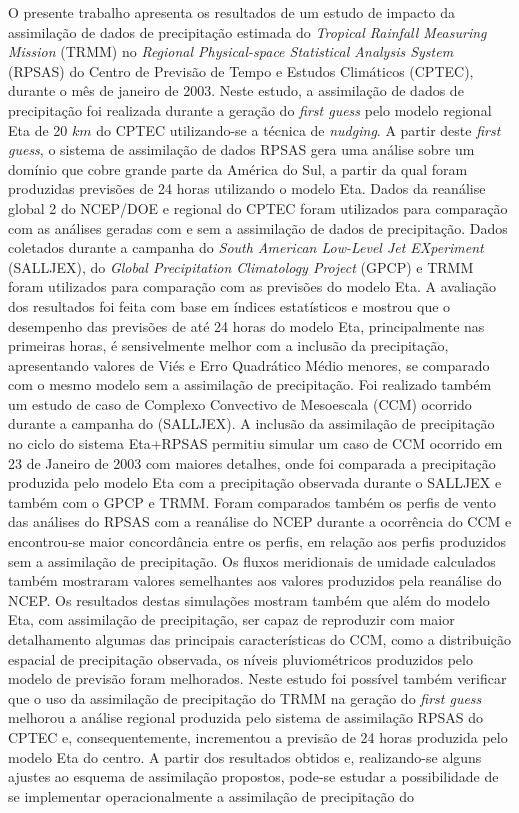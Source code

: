 \begin{resumo}
\hypertarget{estilo:abstract}{}

O presente trabalho apresenta os resultados de um estudo de impacto da assimilação de dados de precipitação estimada do \textit{Tropical Rainfall Measuring Mission} (TRMM) no \textit{Regional Physical-space Statistical Analysis System} (RPSAS) do Centro de Previsão de Tempo e Estudos Climáticos (CPTEC), durante  o mês de janeiro de 2003. Neste estudo, a assimilação de dados de precipitação foi realizada durante a geração do \textit{first guess} pelo modelo regional Eta de 20 $km$ do CPTEC utilizando-se a técnica de \textit{nudging}. A partir deste \textit{first guess}, o sistema de assimilação de dados RPSAS gera uma análise sobre um domínio que cobre grande parte da América do Sul, a partir da qual foram produzidas previsões de 24 horas utilizando o modelo Eta. Dados da reanálise global 2 do NCEP/DOE e regional do CPTEC foram utilizados para comparação com as análises geradas com e sem a assimilação de dados de precipitação. Dados coletados durante a campanha do \textit{South American Low-Level Jet EXperiment} (SALLJEX), do \textit{Global Precipitation Climatology Project} (GPCP) e TRMM foram utilizados para comparação com as previsões do modelo Eta. A avaliação dos resultados foi feita com base em índices estatísticos e mostrou que o desempenho das previsões de até 24 horas do modelo Eta, principalmente nas primeiras horas, é sensivelmente melhor com a inclusão da precipitação, apresentando valores de Viés e Erro Quadrático Médio menores, se comparado com o mesmo modelo sem a assimilação de precipitação. Foi realizado também um estudo de caso de Complexo Convectivo de Mesoescala (CCM) ocorrido durante a campanha do (SALLJEX). A inclusão da assimilação de precipitação no ciclo do sistema Eta+RPSAS permitiu simular um caso de CCM ocorrido em 23 de Janeiro de 2003 com maiores detalhes, onde foi comparada a precipitação produzida pelo modelo Eta com a precipitação observada durante o SALLJEX e também com o GPCP e TRMM. Foram comparados também os perfis de vento das análises do RPSAS com a reanálise do NCEP durante a ocorrência do CCM e encontrou-se maior concordância entre os perfis, em relação aos perfis produzidos sem a assimilação de precipitação. Os fluxos meridionais de umidade calculados também mostraram valores semelhantes aos valores produzidos pela reanálise do NCEP. Os resultados destas simulações mostram também que além do modelo Eta, com assimilação de precipitação, ser capaz de reproduzir com maior detalhamento algumas das principais características do CCM, como a distribuição espacial de precipitação observada, os níveis pluviométricos produzidos pelo modelo de previsão foram melhorados. Neste estudo foi possível também verificar que o uso da assimilação de precipitação do TRMM na geração do \textit{first guess} melhorou a análise regional produzida pelo sistema de assimilação RPSAS do CPTEC e, consequentemente, incrementou a previsão de 24 horas produzida pelo modelo Eta do centro. A partir dos resultados obtidos e, realizando-se alguns ajustes ao esquema de assimilação propostos, pode-se estudar a possibilidade de se implementar operacionalmente a assimilação de precipitação do 
\end{resumo}
